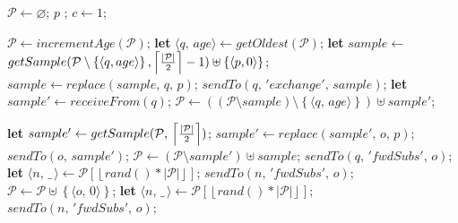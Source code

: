 \begin{algorithmic}[1]
  \Statex
  \initially
    \State $\mathcal{P} \leftarrow \varnothing$;
    \hfill {}
    \State $p$ ; \hfill {}
    \State $c \leftarrow 1$;
    \hfill {}

  \endInitially
  
  \act
     \hfill {}
    \State $\mathcal{P} \leftarrow incrementAge(\mathcal{P})$;
    \State \textbf{let} $ \langle q,\, age \rangle \leftarrow getOldest(\mathcal{P})$;
    \State \textbf{let} $sample \leftarrow $
    \Statex \hfill $getSample(\mathcal{P}\setminus\left\{\langle q, age\rangle\right\}, \left \lceil{|\mathcal{P}|\over{2}} \right \rceil-1) \uplus \left\{\langle p, 0 \rangle\right\}$; 
    \State $sample \leftarrow replace(sample,\,q,\,p)$;
    \State $sendTo(q,\, 'exchange',\, sample)$;
    \State \textbf{let} $sample'\leftarrow receiveFrom(q)$;
    \State $\mathcal{P} \leftarrow ((\mathcal{P} \setminus sample) \setminus \left\{\langle q,\, age \rangle \right\}) \uplus sample'$;
    \EndFunction
  \endAct
  
  \pas
     \hfill {}
    \State \textbf{let} $sample' \leftarrow getSample(\mathcal{P} ,\, \left\lceil |\mathcal{P}|\over{2} \right\rceil )$;
    \State $sample' \leftarrow replace(sample',\,o,\,p);$
    \State $sendTo(o ,\, sample')$;
    \State $\mathcal{P} \leftarrow (\mathcal{P} \setminus sample') \uplus
    sample$; 
    \EndFunction
    \Statex
     \hfill {}
    \State {}
    {$sendTo(q,\, 'fwdSubs',\, o)$;}
    \State \textbf{let} $\langle n,\, \_ \,\rangle \leftarrow 
    \mathcal{P}[\left\lfloor rand()*|\mathcal{P}|\right\rfloor]$;
    \State $sendTo( n,\, 'fwdSubs',\, o)$;
    \EndFor
    \EndFunction
    \Statex
     \hfill {}
    \State $\mathcal{P} \leftarrow
    \mathcal{P}\uplus \left\{\langle o,\, 0 \rangle\right\}$;
    \Else
    \State \textbf{let} $\langle n,\, \_ \,\rangle \leftarrow 
    \mathcal{P}[\left\lfloor rand()*|\mathcal{P}|\right\rfloor]$;
    \State $sendTo( n,\, 'fwdSubs',\, o)$;
    \EndIf
    \EndFunction
  \endPas
  
\end{algorithmic}
